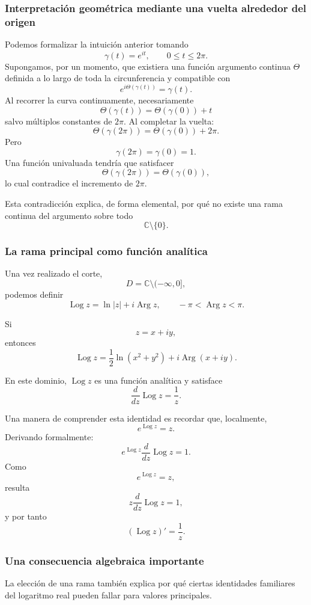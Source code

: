 \documentclass[12pt]{article}
\DeclareMathOperator{\Arg}{Arg}
\DeclareMathOperator{\Log}{Log}
\begin{document}
\subsubsection*{Interpretación geométrica mediante una vuelta alrededor del origen}
Podemos formalizar la intuición anterior tomando
\[
\gamma(t)=e^{it},
\qquad0\leq t\leq2\pi.
\]
Supongamos, por un momento, que existiera una función argumento continua
$\Theta$ definida a lo largo de toda la circunferencia y compatible con
\[
e^{i\Theta(\gamma(t))}=\gamma(t).
\]
Al recorrer la curva continuamente, necesariamente
\[
\Theta(\gamma(t))=\Theta(\gamma(0))+t
\]
salvo múltiplos constantes de $2\pi$. Al completar la vuelta:
\[
\Theta(\gamma(2\pi))
=
\Theta(\gamma(0))+2\pi.
\]
Pero
\[
\gamma(2\pi)=\gamma(0)=1.
\]
Una función univaluada tendría que satisfacer
\[
\Theta(\gamma(2\pi))
=
\Theta(\gamma(0)),
\]
lo cual contradice el incremento de $2\pi$.

Esta contradicción explica, de forma elemental, por qué no existe una rama
continua del argumento sobre todo
\[
\mathbb C\setminus\{0\}.
\]

\subsubsection*{La rama principal como función analítica}

Una vez realizado el corte,
\[
D=\mathbb C\setminus(-\infty,0],
\]
podemos definir
\[
\Log z=\ln|z|+i\Arg z,
\qquad -\pi<\Arg z<\pi.
\]

Si
\[
z=x+iy,
\]
entonces
\[
\Log z
=
\frac12\ln(x^2+y^2)
+i\Arg(x+iy).
\]

En este dominio, $\Log z$ es una función analítica y satisface
\[
\boxed{
\frac{d}{dz}\Log z=\frac1z.
}
\]

Una manera de comprender esta identidad es recordar que, localmente,
\[
e^{\Log z}=z.
\]
Derivando formalmente:
\[
e^{\Log z}\frac{d}{dz}\Log z=1.
\]
Como
\[
e^{\Log z}=z,
\]
resulta
\[
z\frac{d}{dz}\Log z=1,
\]
y por tanto
\[
\boxed{
(\Log z)'=\frac1z.
}
\]
\subsubsection*{Una consecuencia algebraica importante}
La elección de una rama también explica por qué ciertas identidades familiares
del logaritmo real pueden fallar para valores principales.
\end{document}
